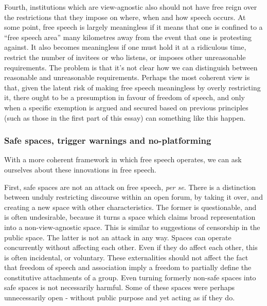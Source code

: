 Fourth, institutions which are view-agnostic also should not have free
reign over the restrictions that they impose on where, when and how
speech occurs. At some point, free speech is largely meaningless if it
means that one is confined to a ``free speech area'' many kilometres
away from the event that one is protesting against. It also becomes
meaningless if one must hold it at a ridiculous time, restrict the
number of invitees or who listens, or imposes other unreasonable
requirements. The problem is that it's not clear how we can distinguish
between reasonable and unreasonable requirements. Perhaps the most
coherent view is that, given the latent risk of making free speech
meaningless by overly restricting it, there ought to be a presumption in
favour of freedom of speech, and only when a specific exemption is
argued and secured based on previous principles (such as those in the
first part of this essay) can something like this happen.

\subsubsection{Safe spaces, trigger warnings and
no-platforming}\label{safe-spaces-trigger-warnings-and-no-platforming}

With a more coherent framework in which free speech operates, we can ask
ourselves about these innovations in free speech.

First, safe spaces are not an attack on free speech, \emph{per se}.
There is a distinction between unduly restricting discourse within an
open forum, by taking it over, and creating a new space with other
characteristics. The former is questionable, and is often undesirable,
because it turns a space which claims broad representation into a
non-view-agnostic space. This is similar to suggestions of censorship in
the public space. The latter is not an attack in any way. Spaces can
operate concurrently without affecting each other. Even if they do
affect each other, this is often incidental, or voluntary. These
externalities should not affect the fact that freedom of speech and
association imply a freedom to partially define the constitutive
attachments of a group. Even turning formerly non-safe spaces into safe
spaces is not necessarily harmful. Some of these spaces were perhaps
unnecessarily open - without public purpose and yet acting as if they
do.

